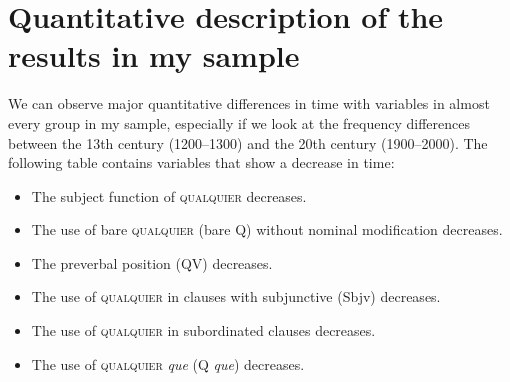 



\section{Quantitative description of the results in my sample}\label{sec:5.2}

We can observe major quantitative differences in time with variables in almost every group in my sample, especially if we look at the frequency differences between the 13th century (1200–1300) and the 20th century (1900–2000). The following table contains variables that show a decrease in time:

\begin{itemize}
\item The subject function of \textsc{qualquier} decreases.
\item The use of bare \textsc{qualquier} (bare Q) without nominal modification decreases.
\item The preverbal position (QV) decreases.
\item The use of \textsc{qualquier} in clauses with subjunctive (Sbjv) decreases.
\item The use of \textsc{qualquier} in subordinated clauses decreases.
\item The use of \textsc{qualquier} \textit{que} (Q \textit{que}) decreases.
\end{itemize}


